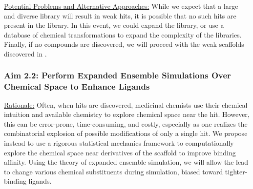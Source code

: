\documentclass[12pt]{article}
\begin{document}
\underline{Potential Problems and Alternative Approaches:} While we expect that a large and diverse library will result in weak hits, it is possible that no such hits are present in the library. In this event, we could expand the library, or use a database of chemical transformations \cite{chemtransform} to expand the complexity of the libraries. Finally, if no compounds are discovered, we will proceed with the weak scaffolds discovered in \cite{ostrem2013} \cite{fesik}.

\subsubsection*{Aim 2.2: Perform Expanded Ensemble Simulations Over Chemical Space to Enhance Ligands}

\underline{Rationale:} Often, when hits are discovered, medicinal chemists use their chemical intuition and available chemistry to explore chemical space near the hit. However, this can be error-prone, time-consuming, and costly, especially as one realizes the combinatorial explosion of possible modifications of only a single hit. We propose instead to use a rigorous statistical mechanics framework to computationally explore the chemical space near derivatives of the scaffold to improve binding affinity. Using the theory of expanded ensemble simulation\cite{lyubartsev1992}, we will allow the lead to change various chemical substituents during simulation, biased toward tighter-binding ligands. 
\end{document}
